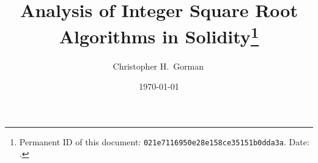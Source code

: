 
\author{Christopher H.~Gorman\,}
\title{Analysis of Integer Square Root Algorithms in Solidity\thanks{%
Permanent ID of this document:
\texttt{021e7116950e28e158ce35151b0dda3a}.
Date: {\protect{}\protect\DTMtoday}.}
}
\date{\today}






